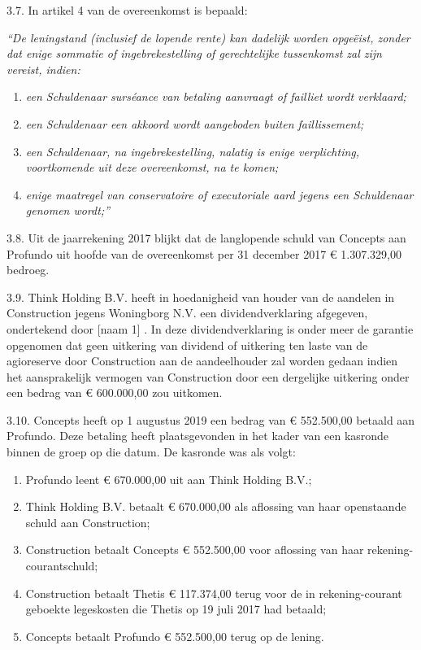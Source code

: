 \documentclass[
  dutch,
  a4paper,
]{article}
\providecommand{\tightlist}{%
  \setlength{\itemsep}{0pt}\setlength{\parskip}{0pt}}
\begin{document}
3.7. In artikel 4 van de overeenkomst is bepaald:

\emph{``De leningstand (inclusief de lopende rente) kan dadelijk worden opgeëist, zonder dat enige sommatie of ingebrekestelling of gerechtelijke tussenkomst zal zijn vereist, indien:}

\begin{enumerate}
\def\labelenumi{\alph{enumi}.}
\tightlist
\item
  \emph{een Schuldenaar surséance van betaling aanvraagt of failliet wordt verklaard;}
\item
  \emph{een Schuldenaar een akkoord wordt aangeboden buiten faillissement;}
\item
  \emph{een Schuldenaar, na ingebrekestelling, nalatig is enige verplichting, voortkomende uit deze overeenkomst, na te komen;}
\item
  \emph{enige maatregel van conservatoire of executoriale aard jegens een Schuldenaar genomen wordt;''}
\end{enumerate}

3.8. Uit de jaarrekening 2017 blijkt dat de langlopende schuld van Concepts aan Profundo uit hoofde van de overeenkomst per 31 december 2017 € 1.307.329,00 bedroeg.

3.9. Think Holding B.V. heeft in hoedanigheid van houder van de aandelen in Construction jegens Woningborg N.V. een dividendverklaring afgegeven, ondertekend door {[}naam 1{]} . In deze dividendverklaring is onder meer de garantie opgenomen dat geen uitkering van dividend of uitkering ten laste van de agioreserve door Construction aan de aandeelhouder zal worden gedaan indien het aansprakelijk vermogen van Construction door een dergelijke uitkering onder een bedrag van € 600.000,00 zou uitkomen.

3.10. Concepts heeft op 1 augustus 2019 een bedrag van € 552.500,00 betaald aan Profundo. Deze betaling heeft plaatsgevonden in het kader van een kasronde binnen de groep op die datum. De kasronde was als volgt:

\begin{enumerate}
\def\labelenumi{\arabic{enumi}.}
\tightlist
\item
  Profundo leent € 670.000,00 uit aan Think Holding B.V.;
\item
  Think Holding B.V. betaalt € 670.000,00 als aflossing van haar openstaande schuld aan Construction;
\item
  Construction betaalt Concepts € 552.500,00 voor aflossing van haar rekening-courantschuld;
\item
  Construction betaalt Thetis € 117.374,00 terug voor de in rekening-courant geboekte legeskosten die Thetis op 19 juli 2017 had betaald;
\item
  Concepts betaalt Profundo € 552.500,00 terug op de lening.
\end{enumerate}
\end{document}
